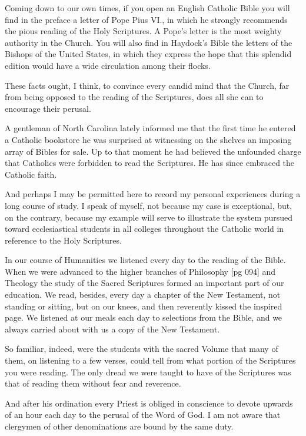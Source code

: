 Coming down to our own times, if you open an
English Catholic Bible you will find in the preface
a letter of Pope Pius VI., in which he strongly
recommends the pious reading of the Holy Scriptures.
A Pope's letter is the most weighty authority
in the Church. You will also find in Haydock's
Bible the letters of the Bishops of the
United States, in which they express the hope
that this splendid edition would have a wide circulation
among their flocks.

These facts ought, I think, to convince every
candid mind that the Church, far from being opposed
to the reading of the Scriptures, does all
she can to encourage their perusal.

A gentleman of North Carolina lately informed
me that the first time he entered a Catholic bookstore
he was surprised at witnessing on the
shelves an imposing array of Bibles for sale. Up
to that moment he had believed the unfounded
charge that Catholics were forbidden to read the
Scriptures. He has since embraced the Catholic
faith.

And perhaps I may be permitted here to record
my personal experiences during a long course of
study. I speak of myself, not because my case
is exceptional, but, on the contrary, because my
example will serve to illustrate the system pursued
toward ecclesiastical students in all colleges
throughout the Catholic world in reference to the
Holy Scriptures.

In our course of Humanities we listened every
day to the reading of the Bible. When we were
advanced to the higher branches of Philosophy
[pg 094]
and Theology the study of the Sacred Scriptures
formed an important part of our education. We
read, besides, every day a chapter of the New
Testament, not standing or sitting, but on our
knees, and then reverently kissed the inspired
page. We listened at our meals each day to selections
from the Bible, and we always carried about
with us a copy of the New Testament.

So familiar, indeed, were the students with the
sacred Volume that many of them, on listening to
a few verses, could tell from what portion of the
Scriptures you were reading. The only dread we
were taught to have of the Scriptures was that
of reading them without fear and reverence.

And after his ordination every Priest is obliged
in conscience to devote upwards of an hour each
day to the perusal of the Word of God. I am not
aware that clergymen of other denominations are
bound by the same duty.

